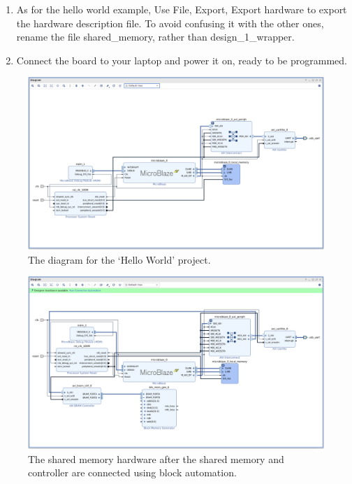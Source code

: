 \documentclass[../physical_computing.tex]{subfiles}
\begin{document}
\begin{enumerate}
    \item As for the hello world example, Use File, Export, Export hardware to export the hardware description file. To avoid confusing it with the other ones, rename the file shared\_memory, rather than design\_1\_wrapper.
    \item Connect the board to your laptop and power it on, ready to be programmed.
\end{enumerate}

\begin{figure}
    \centering
    \includegraphics[width=\textwidth]{appendix_9/figures/prereq_diagram.png}
    \caption{The diagram for the `Hello World' project.}
    \label{fig:appendix_8_prereq}
\end{figure}

\begin{figure}
    \centering
    \includegraphics[width=\textwidth]{appendix_9/figures/after_bram.png}
    \caption{The shared memory hardware after the shared memory and controller are connected using block automation.}
    \label{fig:appendix_8_afterbram}
\end{figure}
\end{document}

